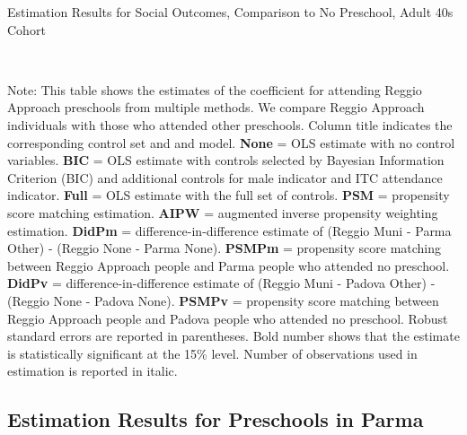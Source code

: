 \begin{table}[H] \caption{Estimation Results for Social Outcomes, Comparison to No Preschool, Adult 40s Cohort} \label{ols-S-adult40-reg-none}
\scalebox{0.8}{}
\vspace{1ex} \\
\footnotesize\raggedright{Note: This table shows the estimates of the coefficient for attending Reggio Approach preschools from multiple methods. We compare Reggio Approach individuals with those who attended other preschools. Column title indicates the corresponding control set and and model. \textbf{None} = OLS estimate with no control variables. \textbf{BIC} = OLS estimate with controls selected by Bayesian Information Criterion (BIC) and additional controls for male indicator and ITC attendance indicator. \textbf{Full} = OLS estimate with the full set of controls. \textbf{PSM} =  propensity score matching estimation. \textbf{AIPW} = augmented inverse propensity weighting estimation. \textbf{DidPm} = difference-in-difference estimate of (Reggio Muni - Parma Other) - (Reggio None - Parma None). \textbf{PSMPm} = propensity score matching between Reggio Approach people and Parma people who attended no preschool. \textbf{DidPv} = difference-in-difference estimate of (Reggio Muni - Padova Other) - (Reggio None - Padova None). \textbf{PSMPv} = propensity score matching between Reggio Approach people and Padova people who attended no preschool. Robust standard errors are reported in parentheses. Bold number shows that the estimate is statistically significant at the 15\% level. Number of observations used in estimation is reported in italic.}
\end{table}










\subsection{Estimation Results for Preschools in Parma}




